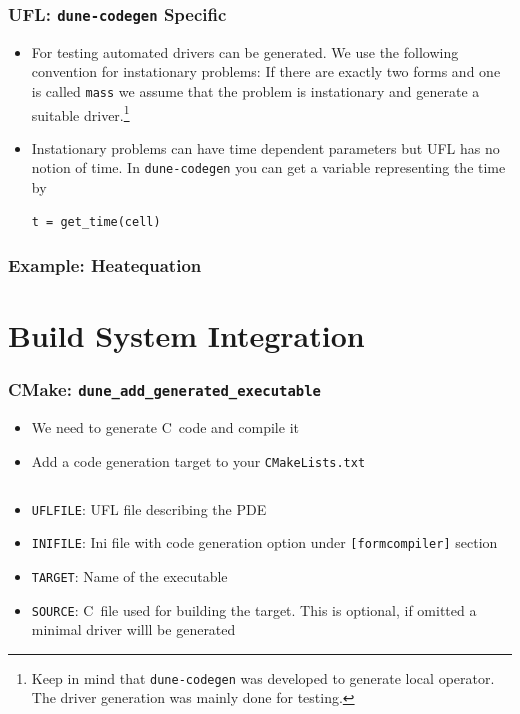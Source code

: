 \documentclass[aspectratio=169,11pt]{beamer}
\theoremstyle{definition}
\def\CC{{C\nolinebreak[4]\hspace{-.05em}\raisebox{.4ex}{\tiny\bf ++}}}
\begin{document}
\begin{frame}[fragile]
  \frametitle{UFL: \lstinline{dune-codegen} Specific}
  \begin{itemize}
  \item For testing automated drivers can be generated. We use the following
    convention for instationary problems: If there are exactly two forms and
    one is called \lstinline{mass} we assume that the problem is instationary
    and generate a suitable driver.\footnote{Keep in mind that
      \lstinline{dune-codegen} was developed to generate local operator. The
      driver generation was mainly done for testing.}
  \item Instationary problems can have time dependent parameters but UFL has no
    notion of time. In \lstinline{dune-codegen} you can get a variable
    representing the time by
    \begin{lstlisting}[basicstyle=\scriptsize, backgroundcolor=\color{listingbg}]
t = get_time(cell)
    \end{lstlisting}
    \end{itemize}
\end{frame}

\begin{frame}
  \frametitle{Example: Heatequation}
  
\end{frame}


\section{Build System Integration}

\begin{frame}[fragile]
  \frametitle{CMake: \lstinline{dune_add_generated_executable}}

  \begin{itemize}
  \item We need to generate \CC\ code and compile it
  \item Add a code generation target to your \lstinline{CMakeLists.txt}
    \inputminted[fontsize=\scriptsize]{cmake}{generated_executable.txt}
  \item \lstinline{UFLFILE}: UFL file describing the PDE
  \item \lstinline{INIFILE}: Ini file with code generation option under \lstinline{[formcompiler]} section
  \item \lstinline{TARGET}: Name of the executable
  \item \lstinline{SOURCE}: \CC\ file used for building the target. This is
    optional, if omitted a minimal driver willl be generated
  \end{itemize}
\end{frame}
\end{document}
